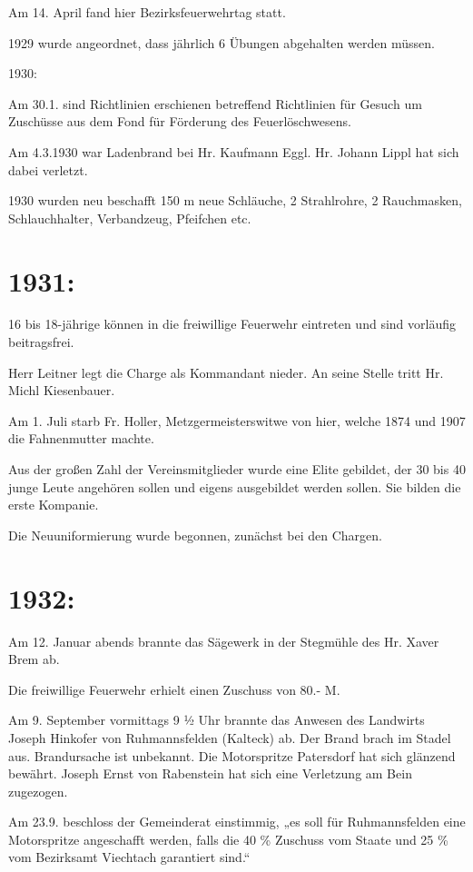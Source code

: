 \documentclass[12pt,a4paper]{book}
\begin{document}
Am 14. April fand hier Bezirksfeuerwehrtag statt.

1929 wurde angeordnet, dass jährlich 6 Übungen abgehalten werden müssen.

1930:

Am 30.1. sind Richtlinien erschienen betreffend Richtlinien für Gesuch um
Zuschüsse aus dem Fond für Förderung des Feuerlöschwesens.

Am 4.3.1930 war Ladenbrand bei Hr. Kaufmann Eggl. Hr. Johann Lippl hat sich
dabei verletzt.

1930 wurden neu beschafft 150 m neue Schläuche, 2 Strahlrohre, 2 Rauchmasken,
Schlauchhalter, Verbandzeug, Pfeifchen etc.

\section{1931:}

16 bis 18-jährige können in die freiwillige Feuerwehr eintreten und sind
vorläufig beitragsfrei.

Herr Leitner legt die Charge als Kommandant nieder. An seine Stelle tritt Hr.
Michl Kiesenbauer.

Am 1. Juli starb Fr. Holler, Metzgermeisterswitwe von hier, welche 1874 und 1907
die Fahnenmutter machte.

Aus der großen Zahl der Vereinsmitglieder wurde eine Elite gebildet, der 30 bis
40 junge Leute angehören sollen und eigens ausgebildet werden sollen. Sie bilden
die erste Kompanie.

Die Neuuniformierung wurde begonnen, zunächst bei den Chargen.

\section{1932:}

Am 12. Januar abends brannte das Sägewerk in der Stegmühle des Hr. Xaver Brem
ab.

Die freiwillige Feuerwehr erhielt einen Zuschuss von 80.- M.

Am 9. September vormittags 9 ½ Uhr brannte das Anwesen des Landwirts Joseph
Hinkofer von Ruhmannsfelden (Kalteck) ab. Der Brand brach im Stadel aus.
Brandursache ist unbekannt. Die Motorspritze Patersdorf hat sich glänzend
bewährt. Joseph Ernst von Rabenstein hat sich eine Verletzung am Bein zugezogen.

Am 23.9. beschloss der Gemeinderat einstimmig, „es soll für Ruhmannsfelden eine
Motorspritze angeschafft werden, falls die 40 \% Zuschuss vom Staate und 25 \% vom
Bezirksamt Viechtach garantiert sind.“
\end{document}
